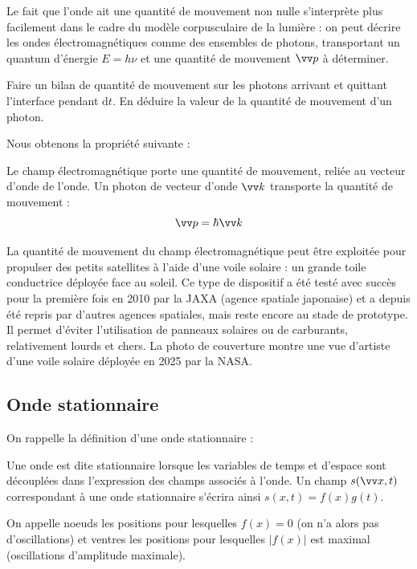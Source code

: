 \documentclass[11pt,fleqn]{book} %
\newcommand{\dd}{\mathrm{d}}
\begin{document}
Le fait que l'onde ait une quantité de mouvement non nulle s'interprète plus facilement dans le cadre du modèle corpusculaire de la lumière : on peut décrire les ondes électromagnétiques comme des ensembles de photons, transportant un quantum d'énergie $E = h \nu$ et une quantité de mouvement $\vv p$ à déterminer.
\begin{capex}
	Faire un bilan de quantité de mouvement sur les photons arrivant et quittant l'interface pendant $\dd t$. En déduire la valeur de la quantité de mouvement d'un photon.
\end{capex}

Nous obtenons la propriété suivante :
\begin{proposition}
	Le champ électromagnétique porte une quantité de mouvement, reliée au vecteur d'onde de l'onde. Un photon de vecteur d'onde $\vv k$ transporte la quantité de mouvement :
	\begin{equation}
		\vv p = \hbar \vv k
	\end{equation}
\end{proposition}

\begin{encart}
	La quantité de mouvement du champ électromagnétique peut être exploitée pour propulser des petits satellites à l'aide d'une voile solaire : un grande toile conductrice déployée face au soleil. Ce type de dispositif a été testé avec succès pour la première fois en 2010 par la JAXA (agence spatiale japonaise) et a depuis été repris par d'autres agences spatiales, mais reste encore au stade de prototype. Il permet d'éviter l'utilisation de panneaux solaires ou de carburants, relativement lourds et chers. La photo de couverture montre une vue d'artiste d'une voile solaire déployée en 2025 par la NASA.
\end{encart}

\subsection{Onde stationnaire}

On rappelle la définition d'une onde stationnaire :
\begin{definition}
	Une onde est dite stationnaire lorsque les variables de temps et d'espace sont découplées dans l'expression des champs associés à l'onde. Un champ $s(\vv x,t)$ correspondant à une onde stationnaire s'écrira ainsi $s(x,t) = f(x) g(t)$.

	On appelle noeuds les positions pour lesquelles $f(x) = 0$ (on n'a alors pas d'oscillations) et ventres les positions pour lesquelles $|f(x)|$ est maximal (oscillations d'amplitude maximale).
\end{definition}
\end{document}

